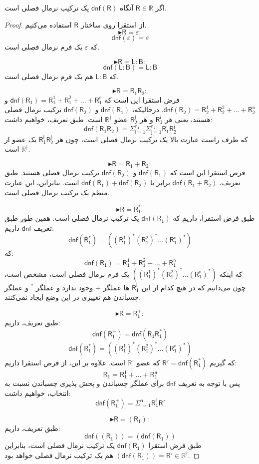 \begin{thm}
	اگر $\mathsf{R} \in \mathbb{R}$ آنگاه $\mathsf{dnf(R)}$ یک ترکیب نرمال فصلی است.
\end{thm}
\begin{proof}
از استقرا روی ساختار $\mathsf{R}$ استفاده می‌کنیم.
$$\blacktriangleright \mathsf{R}=\varepsilon:$$
$$\mathsf{dnf(\varepsilon)}=\varepsilon$$
که $\varepsilon$ یک فرم نرمال فصلی است.


$$\blacktriangleright \mathsf{R=L:B}:$$
$$\mathsf{dnf(\mathsf{L:B})}=\mathsf{L:B}$$
که $\mathsf{L:B}$ هم یک فرم نرمال فصلی است.


$$\blacktriangleright \mathsf{R=R_1R_2}:$$
فرض استقرا این است که 
$\mathsf{dnf(R_1)=R_1^1+R_1^2+...+R_1^n}$
و
$\mathsf{dnf(R_2)=R_2^1+R_2^2+...+R_2^n}$.
درحالیکه، $\mathsf{dnf(R_1)}$ و $\mathsf{dnf(R_2)}$ ترکیب نرمال فصلی هستند، یعنی هر $\mathsf{R_1^i}$ و هر $\mathsf{R_2^j}$ عضو $\mathbb{R^{\nmid}}$ است.
طبق تعریف، خواهیم داشت:
$$\mathsf{dnf}(\mathsf{R_1 R_2})=\mathsf{\Sigma_{i=1}^{n_1}\Sigma_{j=1}^{n_2} R_1^i R_2^j}$$
که طرف راست عبارت بالا یک ترکیب نرمال فصلی است، چون هر  
$\mathsf{R_1^i R_2^j}$
یک عضو از $\mathbb{R}^\nmid$ است.

$$\blacktriangleright \mathsf{R=R_1+R_2}:$$
فرض استقرا این است که $\mathsf{dnf(R_1)}$ و $\mathsf{dnf(R_2)}$ ترکیب نرمال فصلی هستند. طبق تعریف،
$\mathsf{dnf(R_1+R_2)}$
برابر با
$\mathsf{dnf(R_1)+dnf(R_2)}$
است. بنابراین، این عبارت منظم یک ترکیب نرمال فصلی است.

$$\blacktriangleright \mathsf{R=R_1^*}:$$
طبق فرض استقرا، داریم که $\mathsf{dnf(R_1)}$ یک ترکیب نرمال فصلی است. همین طور طبق تعریف $\mathsf{dnf}$ داریم:
$$\mathsf{dnf(R_1^*)= ((R_1^1)^* (R_1^2)^* ... (R_1^n)^*)}$$
که:
$$\mathsf{dnf(R_1)=R_1^1+R_1^2+...+R_1^n}$$
که اینکه $\mathsf{((R_1^1)^* (R_1^2)^* ... (R_1^n)^*)}$ یک فرم نرمال فصلی است، مشخص است، چون می‌دانیم که در هیچ کدام از این $\mathsf{R_1^i}$ ها عملگر $+$ وجود ندارد و عملگر $ ^*$ و عملگر چسباندن هم تغییری در این وضع ایجاد نمی‌کنند.

$$\blacktriangleright \mathsf{R=R_1^+}:$$
طبق تعریف، داریم:
$$\mathsf{dnf(R_1^+)=dnf(R_1 R_1^*)}$$
$$\mathsf{dnf(R_1^*)= ((R_1^1)^* (R_1^2)^* ... (R_1^n)^*)}$$
که گیریم 
$\mathsf{R'=dnf(R_1^*)}$
 که عضو 
 $\mathbb{R^\nmid}$
است. علاوه بر این، از فرض استقرا داریم:
$$\mathsf{R_1= R_1^1 + ... + R_1^n}$$
پس با توجه به تعریف $\mathsf{dnf}$ برای عملگر چسباندن و پخش پذیری چسباندن نسبت به انتخاب، خواهیم داشت:
$$\mathsf{dnf(R_1^+) = \Sigma_{i=1}^n R_1^i R'}$$

$$\blacktriangleright \mathsf{R=(R_1)}:$$
طبق تعریف، داریم:
$$\mathsf{dnf((R_1))=(dnf(R_1))}$$
طبق فرض استقرا 
$\mathsf{dnf(R_1)}$
یک ترکیب نرمال فصلی است، بنابراین 
$\mathsf{(dnf(R_1))=R'} \in \mathbb{R^\nmid}$ 
هم یک ترکیب نرمال فصلی خواهد بود.

\end{proof}

